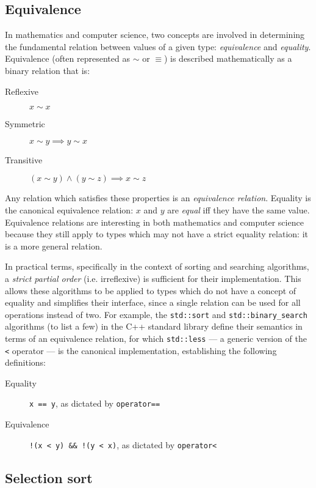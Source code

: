 \subsection{Equivalence}

In mathematics and computer science, two concepts are involved in determining
the fundamental relation between values of a given type: \textit{equivalence}
and \textit{equality}.  Equivalence (often represented as $\sim$ or $\equiv$) is
described mathematically as a binary relation that is:

\begin{description}
    \item[Reflexive] $x \sim x$
    \item[Symmetric] $x \sim y \implies y \sim x$
    \item[Transitive] $(x \sim y) \land (y \sim z) \implies x \sim z$
\end{description}

Any relation which satisfies these properties is an \textit{equivalence
relation}.  Equality is the canonical equivalence relation: $x$ and $y$ are
\textit{equal} iff they have the same value.  Equivalence relations are
interesting in both mathematics and computer science because they still apply to
types which may not have a strict equality relation: it is a more general
relation.

In practical terms, specifically in the context of sorting and searching
algorithms, a \textit{strict partial order} (i.e. irreflexive) is sufficient for
their implementation.  This allows these algorithms to be applied to types which
do not have a concept of equality and simplifies their interface, since a single
relation can be used for all operations instead of two.  For example, the
\texttt{std::sort} and \texttt{std::binary\_search} algorithms (to list a few)
in the C++ standard library define their semantics in terms of an equivalence
relation, for which \texttt{std::less} --- a generic version of the \texttt{<}
operator --- is the canonical implementation, establishing the following
definitions:

\begin{description}
    \item[Equality]
        \texttt{x == y}, as dictated by \texttt{operator==}
    \item[Equivalence]
        \texttt{!(x < y) \&\& !(y < x)}, as dictated by \texttt{operator<}
\end{description}

\subsection{Selection sort}

